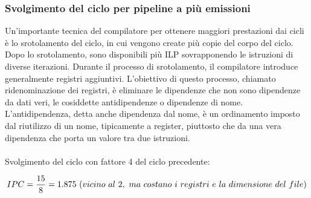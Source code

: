 \documentclass[12pt,a4paper]{article}
\begin{document}
\subsubsection{Svolgimento del ciclo per pipeline a più emissioni}
Un'importante tecnica del compilatore per ottenere maggiori prestazioni dai cicli è lo srotolamento del ciclo, in cui vengono create più copie del corpo del ciclo. Dopo lo srotolamento, sono disponibili più ILP sovrapponendo le istruzioni di diverse iterazioni. Durante il processo di srotolamento, il compilatore introduce generalmente registri aggiuntivi. L'obiettivo di questo processo, chiamato ridenominazione dei registri, è eliminare le dipendenze che non sono dipendenze da dati veri, le cosiddette antidipendenze o dipendenze di nome.\\
L'antidipendenza, detta anche dipendenza dal nome, è un ordinamento imposto dal riutilizzo di un nome, tipicamente a
register, piuttosto che da una vera dipendenza che porta un valore tra due istruzioni.\\
\\
Svolgimento del ciclo con fattore 4 del ciclo precedente:
\begin{center}
\end{center}
$$IPC = {15 \over 8} = 1.875 \ (vicino\ al\ 2,\ ma\ costano\ i\ registri\ e\ la\ dimensione\ del\ file)$$
\end{document}
